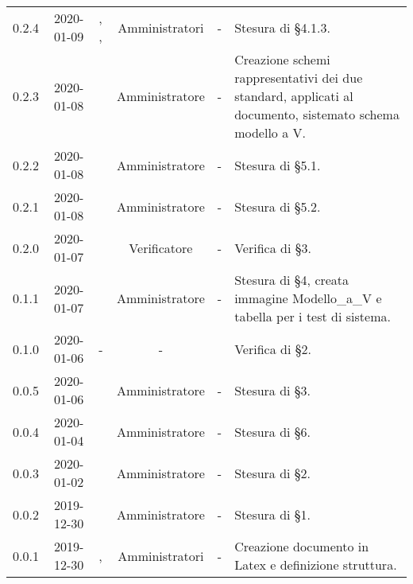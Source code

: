 {\begin{longtable}{ c c  C{2.3cm} c C{3cm} C{3.2cm}}
0.2.4 & 2020-01-09 & \MC{}, \AT{}, \BR{} & Amministratori & - & Stesura di §4.1.3. \\
0.2.3 & 2020-01-08 & \AT{} & Amministratore & - & Creazione schemi rappresentativi dei due standard, applicati al documento, sistemato schema modello a V. \\
0.2.2 & 2020-01-08 & \MC{} & Amministratore & - & Stesura di §5.1. \\
0.2.1 & 2020-01-08 & \AT{} & Amministratore & - & Stesura di §5.2. \\
0.2.0 & 2020-01-07 & \DF{} & Verificatore & - & Verifica di §3. \\
0.1.1 & 2020-01-07 & \AT{} & Amministratore & - & Stesura di §4, creata immagine Modello\_a\_V e tabella per i test di sistema. \\
0.1.0 & 2020-01-06 & - & - & \LD{} & Verifica di §2. \\
0.0.5 & 2020-01-06 & \BR{} & Amministratore & - & Stesura di §3. \\
0.0.4 & 2020-01-04 & \MC{} & Amministratore & - & Stesura di §6. \\
0.0.3 & 2020-01-02 & \MC{} & Amministratore & - & Stesura di §2. \\
0.0.2 & 2019-12-30 & \AT{} & Amministratore & - & Stesura di §1. \\
0.0.1 & 2019-12-30 & \AT{}, \MC{} & Amministratori & - & Creazione documento in Latex e definizione struttura. \\

\end{longtable}
}
